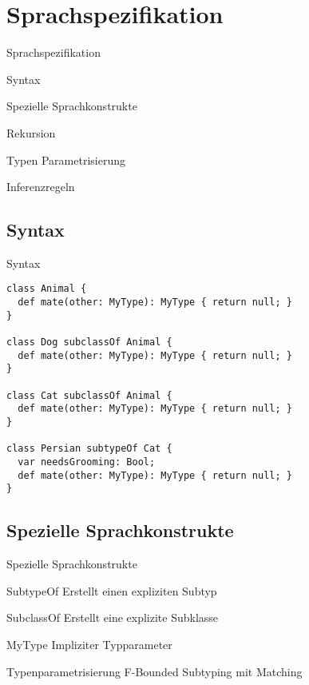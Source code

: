 \section{Sprachspezifikation}
\begin{frame}[t]{Sprachspezifikation}

	\begin{bigitemize}{3mm}
		\item Syntax
		\item Spezielle Sprachkonstrukte
		\item Rekursion
		\item Typen Parametrisierung
		\item Inferenzregeln
	\end{bigitemize}
\end{frame}

\subsection{Syntax}
\begin{frame}[fragile]{Syntax}
\begin{lstlisting}[language=ooplss]
class Animal {
  def mate(other: MyType): MyType { return null; }
}

class Dog subclassOf Animal {
  def mate(other: MyType): MyType { return null; }
}

class Cat subclassOf Animal {
  def mate(other: MyType): MyType { return null; }
}

class Persian subtypeOf Cat {
  var needsGrooming: Bool;
  def mate(other: MyType): MyType { return null; }
}
\end{lstlisting}
\end{frame}

\subsection{Spezielle Sprachkonstrukte}
\begin{frame}{Spezielle Sprachkonstrukte}
	\begin{bigdescription}[<+->]{3mm}
		\item[SubtypeOf] Erstellt einen expliziten Subtyp

		\item[SubclassOf] Erstellt eine explizite Subklasse

		\item[MyType] Impliziter Typparameter

		\item[Typenparametrisierung] F-Bounded Subtyping mit Matching
	\end{bigdescription}
\end{frame}

